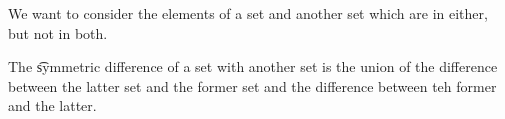 

We want to consider the elements of a set and another set which are in either, but not in both.


The \t{symmetric difference} of a set with another set is the union of the difference between the latter set and the former set and the difference between teh former and the latter.
